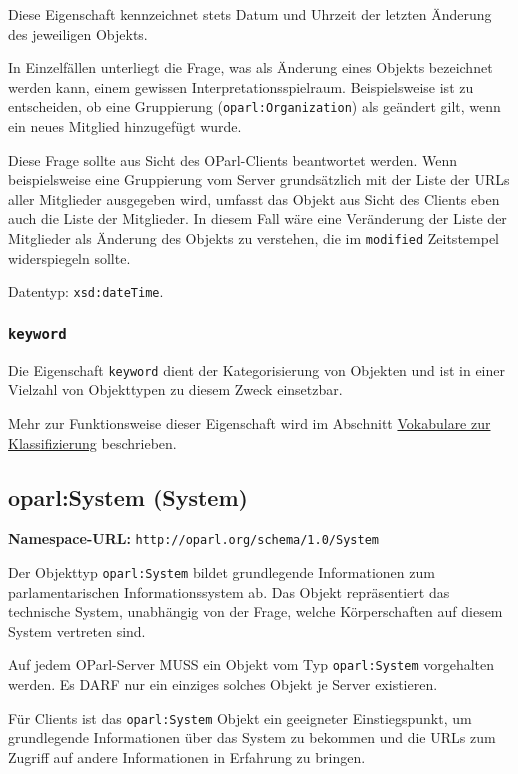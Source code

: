 \documentclass[,a4paper]{article}
\begin{document}
Diese Eigenschaft kennzeichnet stets Datum und Uhrzeit der letzten
Änderung des jeweiligen Objekts.

In Einzelfällen unterliegt die Frage, was als Änderung eines Objekts
bezeichnet werden kann, einem gewissen Interpretationsspielraum.
Beispielsweise ist zu entscheiden, ob eine Gruppierung
(\texttt{oparl:Organization}) als geändert gilt, wenn ein neues Mitglied
hinzugefügt wurde.

Diese Frage sollte aus Sicht des OParl-Clients beantwortet werden. Wenn
beispielsweise eine Gruppierung vom Server grundsätzlich mit der Liste
der URLs aller Mitglieder ausgegeben wird, umfasst das Objekt aus Sicht
des Clients eben auch die Liste der Mitglieder. In diesem Fall wäre eine
Veränderung der Liste der Mitglieder als Änderung des Objekts zu
verstehen, die im \texttt{modified} Zeitstempel widerspiegeln sollte.

Datentyp: \texttt{xsd:dateTime}.

\subsubsection{\texttt{keyword}}\label{keyword}

Die Eigenschaft \texttt{keyword} dient der Kategorisierung von Objekten
und ist in einer Vielzahl von Objekttypen zu diesem Zweck einsetzbar.

Mehr zur Funktionsweise dieser Eigenschaft wird im Abschnitt
\hyperref[vokabulareux5fklassifizierung]{Vokabulare zur Klassifizierung}
beschrieben.

\subsection{oparl:System (System)}\label{oparlux5fsystem}

\textbf{Namespace-URL:} \texttt{http://oparl.org/schema/1.0/System}

Der Objekttyp \texttt{oparl:System} bildet grundlegende Informationen
zum parlamentarischen Informationssystem ab. Das Objekt repräsentiert
das technische System, unabhängig von der Frage, welche Körperschaften
auf diesem System vertreten sind.

Auf jedem OParl-Server MUSS ein Objekt vom Typ \texttt{oparl:System}
vorgehalten werden. Es DARF nur ein einziges solches Objekt je Server
existieren.

Für Clients ist das \texttt{oparl:System} Objekt ein geeigneter
Einstiegspunkt, um grundlegende Informationen über das System zu
bekommen und die URLs zum Zugriff auf andere Informationen in Erfahrung
zu bringen.
\end{document}
